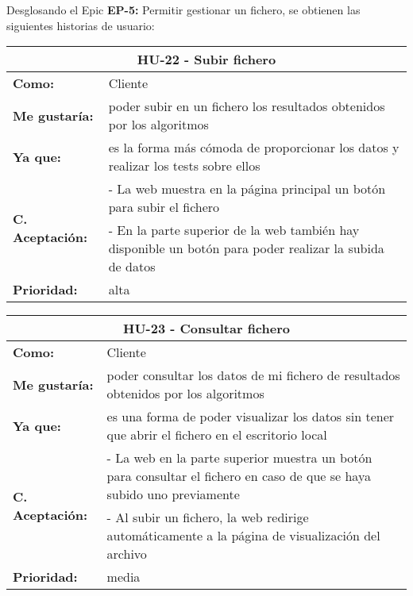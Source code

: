 
\newpage
Desglosando el Epic \textbf{EP-5:} Permitir gestionar un fichero, se obtienen las siguientes historias de usuario:

\begin{table}[H]
	\begin{tabular}{| p{3cm}| p{12cm} |}
		\hline
		\multicolumn{2}{|c|}{\textbf{HU-22} - Subir fichero} \\ \hline
		\textbf{Como:} & Cliente \\ \hline
		\textbf{Me gustaría:} & poder subir en un fichero los resultados obtenidos por los algoritmos \\ \hline
		\textbf{Ya que:} & es la forma más cómoda de proporcionar los datos y realizar los tests sobre ellos \\ \hline
		\multirow{2}{12cm}{\textbf{C. Aceptación:}} & - La web muestra en la página principal un botón para subir el fichero \\
		& - En la parte superior de la web también hay disponible un botón para poder realizar la subida de datos \\ \hline
		\textbf{\textbf{Prioridad:}} & alta \\ \hline
	\end{tabular}
\end{table}


\begin{table}[H]
	\begin{tabular}{| p{3cm}| p{12cm} |}
		\hline
		\multicolumn{2}{|c|}{\textbf{HU-23} - Consultar fichero} \\ \hline
		\textbf{Como:} & Cliente \\ \hline
		\textbf{Me gustaría:} & poder consultar los datos de mi fichero de resultados obtenidos por los algoritmos \\ \hline
		\textbf{Ya que:} & es una forma de poder visualizar los datos sin tener que abrir el fichero en el escritorio local \\ \hline
		\multirow{2}{12cm}{\textbf{C. Aceptación:}} & - La web en la parte superior muestra un botón para consultar el fichero en caso de que se haya subido uno previamente \\
		& - Al subir un fichero, la web redirige automáticamente a la página de visualización del archivo \\ \hline
		\textbf{\textbf{Prioridad:}} & media \\ \hline
	\end{tabular}
\end{table}

